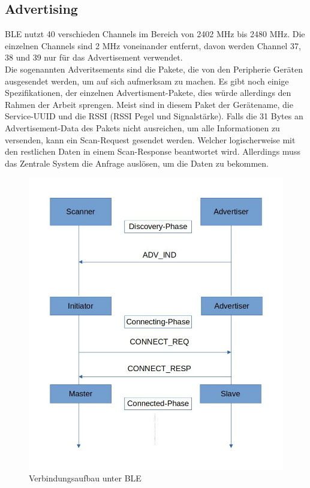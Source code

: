 \documentclass[a4paper,11pt,singlespacing]{article}
\begin{document}
		\subsection{Advertising}
		BLE nutzt 40 verschieden Channels im Bereich von 2402 MHz bis 2480 MHz. Die einzelnen Channels sind 2 MHz voneinander entfernt, davon werden Channel 37, 38 und 39 nur für das Advertisement verwendet. \\
		Die sogenannten Adveritsements sind die Pakete, die von den Peripherie Geräten ausgesendet werden, um auf sich aufmerksam zu machen. Es gibt noch einige Spezifikationen, der einzelnen Advertisment-Pakete, dies würde allerdings den Rahmen der Arbeit sprengen. Meist sind in diesem Paket der Gerätename, die Service-UUID und die RSSI (RSSI Pegel und Signalstärke). Falls die 31 Bytes an Advertisement-Data des Pakets nicht ausreichen, um alle Informationen zu versenden, kann ein Scan-Request gesendet werden. Welcher logischerweise mit den restlichen Daten in einem Scan-Response beantwortet wird. Allerdings muss das Zentrale System die Anfrage auslösen, um die Daten zu bekommen.
		\begin{figure}[ht]
			\centering
			\includegraphics[scale=0.4]{Connection_BLE}
			\caption{Verbindungsaufbau unter BLE}
			\label{connect}
		\end{figure}
\end{document}
